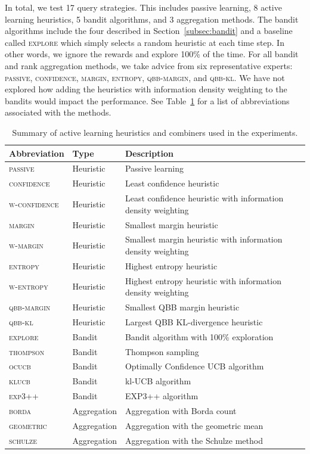 \documentclass[fleqn,10pt,lineno]{wlpeerj} %
\begin{document}
In total, we test 17 query strategies. This includes passive learning, 8 active
learning heuristics, 5 bandit algorithms, and 3 aggregation methods. The bandit
algorithms include the four described in Section~\ref{subsec:bandit} and a
baseline called \textsc{explore} which simply selects a random heuristic at
each time step. In other words, we ignore the rewards and explore 100\% of the
time. For all bandit and rank aggregation methods, we take advice from six
representative experts: \textsc{passive}, \textsc{confidence}, \textsc{margin},
\textsc{entropy}, \textsc{qbb-margin}, and \textsc{qbb-kl}. We have not
explored how adding the heuristics with information density weighting to the
bandits would impact the performance. See Table~\ref{tab:abbre} for a list of
abbreviations associated with the methods.
\begin{table}[htbp]
	\caption {Summary of active learning heuristics and combiners used
	in the experiments.} \label{tab:abbre}
	\centering
	\begin{tabular}{lll}
		\toprule
		Abbreviation & Type  & Description \\
		\midrule
        \textsc{passive}
        	& Heuristic & Passive learning \\
		\textsc{confidence}
			& Heuristic & Least confidence heuristic \\
		\textsc{w-confidence}
        	& Heuristic & Least confidence heuristic with information density weighting \\
        \textsc{margin}
        	& Heuristic & Smallest margin heuristic \\
        \textsc{w-margin}
        	& Heuristic & Smallest margin heuristic with information density weighting \\
        \textsc{entropy}
        	& Heuristic & Highest entropy heuristic \\
		\textsc{w-entropy}
        	& Heuristic & Highest entropy heuristic with information density weighting \\
        \textsc{qbb-margin}
        	& Heuristic & Smallest QBB margin heuristic \\
		\textsc{qbb-kl}
        	& Heuristic & Largest QBB KL-divergence heuristic \\
        \textsc{explore}
			& Bandit & Bandit algorithm with 100\% exploration \\
		\textsc{thompson}
        	& Bandit & Thompson sampling \\
		\textsc{ocucb}
			& Bandit & Optimally Confidence UCB algorithm \\
		\textsc{klucb}
			& Bandit & kl-UCB algorithm \\
		\textsc{exp3++}
			& Bandit & EXP3++ algorithm \\
		\textsc{borda}
			& Aggregation & Aggregation with Borda count \\
		\textsc{geometric}
			& Aggregation & Aggregation with the geometric mean \\
		\textsc{schulze}
			& Aggregation & Aggregation with the Schulze method \\
		\bottomrule
	\end{tabular}
\end{table}
\end{document}
